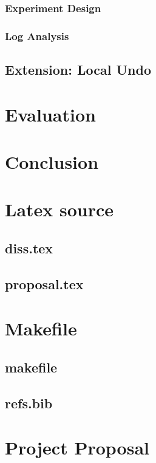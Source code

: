 \documentclass[12pt,a4paper,twoside,openright]{report}
\begin{document}
	\subsection{Experiment Design}
	
	\subsection{Log Analysis}
	
\section{Extension: Local Undo}


\chapter{Evaluation}


\chapter{Conclusion}



\printbibliography

\appendix

\chapter{Latex source}

\section{diss.tex}
{\scriptsize}

\section{proposal.tex}
{\scriptsize}

\chapter{Makefile}

\section{makefile}\label{makefile}
{\scriptsize}

\section{refs.bib}
{\scriptsize}


\chapter{Project Proposal}


\end{document}
